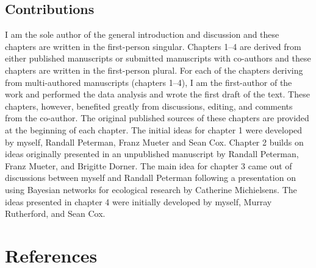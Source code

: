\section{Contributions}\label{contributions}

I am the sole author of the general introduction and discussion and
these chapters are written in the first-person singular. Chapters 1--4
are derived from either published manuscripts or submitted manuscripts
with co-authors and these chapters are written in the first-person
plural. For each of the chapters deriving from multi-authored
manuscripts (chapters 1--4), I am the first-author of the work and
performed the data analysis and wrote the first draft of the text. These
chapters, however, benefited greatly from discussions, editing, and
comments from the co-author. The original published sources of these
chapters are provided at the beginning of each chapter. The initial
ideas for chapter 1 were developed by myself, Randall Peterman, Franz
Mueter and Sean Cox. Chapter 2 builds on ideas originally presented in
an unpublished manuscript by Randall Peterman, Franz Mueter, and
Brigitte Dorner. The main idea for chapter 3 came out of discussions
between myself and Randall Peterman following a presentation on using
Bayesian networks for ecological research by Catherine Michielsens. The
ideas presented in chapter 4 were initially developed by myself, Murray
Rutherford, and Sean Cox.

\chapter{References}\label{references}
